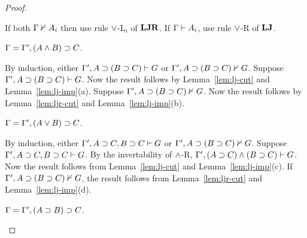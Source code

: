 {\begin{proof}
\begin{description}
      If both $\Gamma \nvdash A_i$ then use rule $\vee$-L$_i$ of $\mathbf{LJR}$.
      If $\Gamma \vdash A_i$, use rule $\vee$-R of $\mathbf{LJ}$.

    \item[Case:]
      $\Gamma = \Gamma', (A \wedge B) \supset C$.

      By induction, either $\Gamma', A \supset (B \supset C) \vdash G$ or
      $\Gamma', A \supset (B \supset C) \nvdash G$.  Suppose
      $\Gamma', A \supset (B \supset C) \vdash G$.  Now the
      result follows by Lemma~\ref{lem:lj-cut} and
      Lemma~\ref{lem:lj-imp}(a).  Suppose
      $\Gamma', A \supset (B \supset C) \nvdash G$.
      Now the result follows by Lemma~\ref{lem:ljr-cut} and
      Lemma~\ref{lem:lj-imp}(b).

    \item[Case:]
      $\Gamma = \Gamma', (A \vee B) \supset C$.

      By induction, either $\Gamma', A \supset C, B \supset C \vdash G$ or
      $\Gamma', A \supset (B \supset C) \nvdash G$.  Suppose
      $\Gamma', A \supset C, B \supset C \vdash G$.  By the invertability
      of $\wedge$-R, $\Gamma', (A \supset C) \wedge (B \supset C) \vdash G$.
      Now the result follows from Lemma~\ref{lem:lj-cut} and
      Lemma~\ref{lem:lj-imp}(c).
      If $\Gamma', A \supset (B \supset C) \nvdash G$,
      the result follows from Lemma~\ref{lem:ljr-cut} and
      Lemma~\ref{lem:lj-imp}(d).

    \item[Case:]
      $\Gamma = \Gamma', (A \supset B) \supset C$.

    \end{description}
  \end{proof}
}


